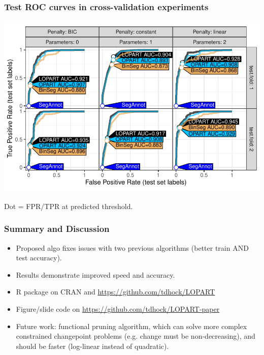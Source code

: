 \documentclass{beamer}
\begin{document}
\begin{frame}
  \frametitle{Test ROC curves in cross-validation experiments}
  \includegraphics[width=\textwidth]{figure-cv-BIC-roc}

  Dot = FPR/TPR at predicted threshold.
  
\end{frame}

\begin{frame}
  \frametitle{Summary and Discussion}
  \begin{itemize}
  \item Proposed algo fixes issues with two previous algorithms (better
  train AND test accuracy).
\item Results demonstrate improved speed and accuracy.
\item R package on CRAN and \url{https://github.com/tdhock/LOPART}
  \item Figure/slide code on \url{https://github.com/tdhock/LOPART-paper}
\item Future work: functional pruning algorithm, which can solve more
  complex constrained changepoint problems (e.g. change must be
  non-decreasing), and should be faster (log-linear instead of
  quadratic).
  \end{itemize}
\end{frame}
\end{document}
